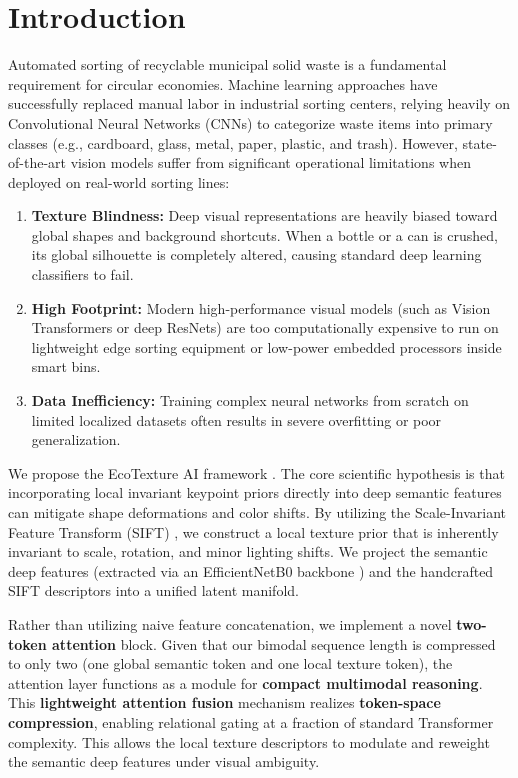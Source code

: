 \documentclass[12pt, a4paper]{article}
\begin{document}
\newpage
\tableofcontents
\newpage

\section{Introduction}
\label{sec:intro}
Automated sorting of recyclable municipal solid waste is a fundamental requirement for circular economies. Machine learning approaches have successfully replaced manual labor in industrial sorting centers, relying heavily on Convolutional Neural Networks (CNNs) to categorize waste items into primary classes (e.g., cardboard, glass, metal, paper, plastic, and trash). However, state-of-the-art vision models suffer from significant operational limitations when deployed on real-world sorting lines:
\begin{enumerate}
    \item \textbf{Texture Blindness:} Deep visual representations are heavily biased toward global shapes and background shortcuts. When a bottle or a can is crushed, its global silhouette is completely altered, causing standard deep learning classifiers to fail.
    \item \textbf{High Footprint:} Modern high-performance visual models (such as Vision Transformers or deep ResNets) are too computationally expensive to run on lightweight edge sorting equipment or low-power embedded processors inside smart bins.
    \item \textbf{Data Inefficiency:} Training complex neural networks from scratch on limited localized datasets often results in severe overfitting or poor generalization.
\end{enumerate}

We propose the EcoTexture AI framework \citep{alaa2026ecotexture}. The core scientific hypothesis is that incorporating local invariant keypoint priors directly into deep semantic features can mitigate shape deformations and color shifts. By utilizing the Scale-Invariant Feature Transform (SIFT) \citep{sift}, we construct a local texture prior that is inherently invariant to scale, rotation, and minor lighting shifts. We project the semantic deep features (extracted via an EfficientNetB0 backbone \citep{efficientnet}) and the handcrafted SIFT descriptors into a unified latent manifold.

Rather than utilizing naive feature concatenation, we implement a novel \textbf{two-token attention} block. Given that our bimodal sequence length is compressed to only two (one global semantic token and one local texture token), the attention layer functions as a module for \textbf{compact multimodal reasoning}. This \textbf{lightweight attention fusion} mechanism realizes \textbf{token-space compression}, enabling relational gating at a fraction of standard Transformer complexity. This allows the local texture descriptors to modulate and reweight the semantic deep features under visual ambiguity.
\end{document}
